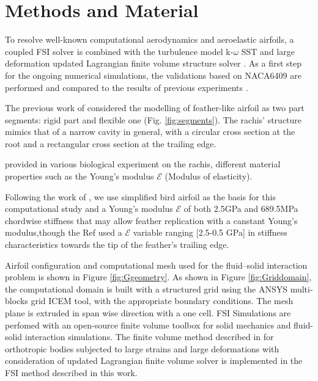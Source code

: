 \section{Methods and Material}


To resolve well-known computational aerodynamics and aeroelastic airfoils, a coupled FSI solver is combined with the turbulence model k-$\omega$ SST and large deformation updated Lagrangian finite volume structure solver \cite{Cardiff2014AOrientations}. As a first step for the ongoing numerical simulations, the validations based on NACA6409 are performed and compared to the results of previous experiments \cite{Gamble2020a}.



The previous work of \citet{Gamble2020b} considered the modelling of feather-like airfoil as two part segments: rigid part and flexible one (Fig. \ref{fig:segments}). The rachis' structure mimics that of a narrow cavity in general, with a circular cross section at the root and a rectangular cross section at the trailing edge.

\citet{Bachmann2012FlexuralProperties} provided in various biological experiment on the rachis, different material properties such as the Young's modulus $\mathcal{E}$ (Modulus of elasticity).

Following the work of \cite{Gamble2020a}, we use simplified bird airfoil as the basis for this computational study and a Young's modulus $\mathcal{E}$ of both 2.5GPa and  689.5MPa chordwise stiffness that may allow feather replication with a canstant Young’s modulus,though the Ref \cite{Gamble2020b} used a $\mathcal{E}$ variable ranging [2.5-0.5 GPa] in stiffness characteristics towards the tip of the feather’s trailing edge.

Airfoil conﬁguration and computational mesh used for the ﬂuid–solid interaction problem is shown in Figure \ref{fig:Ggeometry}. As shown in Figure \ref{fig:Griddomain}, the computational domain is built with a structured grid using the ANSYS multi-blocks grid ICEM tool, with the appropriate boundary conditions. The mesh plane is extruded in span wise direction with a one cell.
FSI Simulations are perfomed with an open-source finite volume toolbox for solid mechanics and fluid-solid interaction simulations. The finite volume method described in \citet{Cardiff2018} for orthotropic bodies subjected to large strains and large deformations with consideration of updated Lagrangian finite volume solver \cite{Tukovic2014} is implemented in the FSI method described in this work. 

